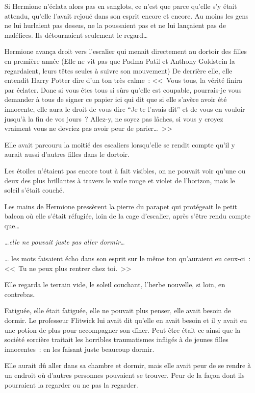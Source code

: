 Si Hermione n'éclata alors pas en sanglots, ce n'est que parce qu'elle s'y était attendu, qu'elle l'avait rejoué dans son esprit encore et encore. Au moins les gens ne lui hurlaient pas dessus, ne la poussaient pas et ne lui lançaient pas de maléfices. Ils détournaient seulement le regard…

Hermione avança droit vers l'escalier qui menait directement au dortoir des filles en première année (Elle ne vit pas que Padma Patil et Anthony Goldstein la regardaient, leurs têtes seules à suivre son mouvement) De derrière elle, elle entendit Harry Potter dire d'un ton très calme~: <<~Vous tous, la vérité finira par éclater. Donc si vous êtes tous si sûrs qu'elle est coupable, pourrais-je vous demander à tous de signer ce papier ici qui dit que si elle s'avère avoir été innocente, elle aura le droit de vous dire “Je te l'avais dit” et de vous en vouloir jusqu'à la fin de vos jours~? Allez-y, ne soyez pas lâches, si vous y croyez vraiment vous ne devriez pas avoir peur de parier…~>>

Elle avait parcouru la moitié des escaliers lorsqu'elle se rendit compte qu'il y aurait aussi d'autres filles dans le dortoir.

\later

Les étoiles n'étaient pas encore tout à fait visibles, on ne pouvait voir qu'une ou deux des plus brillantes à travers le voile rouge et violet de l'horizon, mais le soleil s'était couché.

Les mains de Hermione pressèrent la pierre du parapet qui protégeait le petit balcon où elle s'était réfugiée, loin de la cage d'escalier, après s'être rendu compte que…

…\emph{elle ne pouvait juste pas aller dormir…}

… les mots faisaient écho dans son esprit sur le même ton qu'auraient eu ceux-ci~: <<~Tu ne peux plus rentrer chez toi.~>>

Elle regarda le terrain vide, le soleil couchant, l'herbe nouvelle, si loin, en contrebas.

Fatiguée, elle était fatiguée, elle ne pouvait plus penser, elle avait besoin de dormir. Le professeur Flitwick lui avait dit qu'elle en avait besoin et il y avait eu une potion de plus pour accompagner son dîner. Peut-être était-ce ainsi que la société sorcière traitait les horribles traumatismes infligés à de jeunes filles innocentes~: en les faisant juste beaucoup dormir.

Elle aurait dû aller dans sa chambre et dormir, mais elle avait peur de se rendre à un endroit où d'autres personnes pouvaient se trouver. Peur de la façon dont ils pourraient la regarder ou ne pas la regarder.

